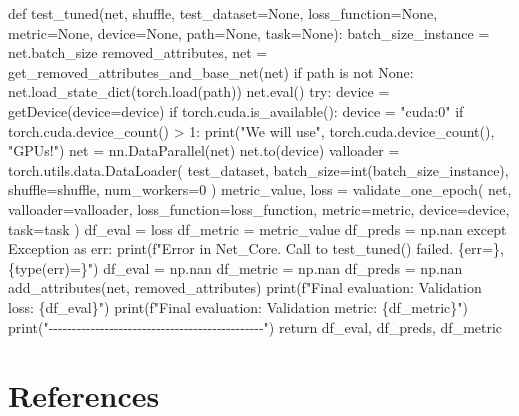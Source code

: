 \documentclass[
  letterpaper,
  DIV=11,
  numbers=noendperiod]{scrreprt}
\newenvironment{Shaded}{\begin{snugshade}}{\end{snugshade}}
\newcommand{\NormalTok}[1]{\textcolor[rgb]{0.00,0.23,0.31}{#1}}
\begin{document}
\begin{Shaded}
\begin{Highlighting}[]
\NormalTok{def test\_tuned(net, shuffle, test\_dataset=None, loss\_function=None,}
\NormalTok{    metric=None, device=None, path=None, task=None):}
\NormalTok{    batch\_size\_instance = net.batch\_size}
\NormalTok{    removed\_attributes, net = get\_removed\_attributes\_and\_base\_net(net)}
\NormalTok{    if path is not None:}
\NormalTok{        net.load\_state\_dict(torch.load(path))}
\NormalTok{        net.eval()}
\NormalTok{    try:}
\NormalTok{        device = getDevice(device=device)}
\NormalTok{        if torch.cuda.is\_available():}
\NormalTok{            device = "cuda:0"}
\NormalTok{            if torch.cuda.device\_count() \textgreater{} 1:}
\NormalTok{                print("We will use", torch.cuda.device\_count(), "GPUs!")}
\NormalTok{                net = nn.DataParallel(net)}
\NormalTok{        net.to(device)}
\NormalTok{        valloader = torch.utils.data.DataLoader(}
\NormalTok{            test\_dataset, batch\_size=int(batch\_size\_instance),}
\NormalTok{            shuffle=shuffle, }
\NormalTok{            num\_workers=0}
\NormalTok{        )}
\NormalTok{        metric\_value, loss = validate\_one\_epoch(}
\NormalTok{            net, valloader=valloader, loss\_function=loss\_function,}
\NormalTok{            metric=metric, device=device, task=task}
\NormalTok{        )}
\NormalTok{        df\_eval = loss}
\NormalTok{        df\_metric = metric\_value}
\NormalTok{        df\_preds = np.nan}
\NormalTok{    except Exception as err:}
\NormalTok{        print(f"Error in Net\_Core. Call to test\_tuned() failed. \{err=\}, }
\NormalTok{            \{type(err)=\}")}
\NormalTok{        df\_eval = np.nan}
\NormalTok{        df\_metric = np.nan}
\NormalTok{        df\_preds = np.nan}
\NormalTok{    add\_attributes(net, removed\_attributes)}
\NormalTok{    print(f"Final evaluation: Validation loss: \{df\_eval\}")}
\NormalTok{    print(f"Final evaluation: Validation metric: \{df\_metric\}")}
\NormalTok{    print("{-}{-}{-}{-}{-}{-}{-}{-}{-}{-}{-}{-}{-}{-}{-}{-}{-}{-}{-}{-}{-}{-}{-}{-}{-}{-}{-}{-}{-}{-}{-}{-}{-}{-}{-}{-}{-}{-}{-}{-}{-}{-}{-}{-}{-}{-}")}
\NormalTok{    return df\_eval, df\_preds, df\_metric}
\end{Highlighting}
\end{Shaded}

\hypertarget{references}{%
\chapter*{References}\label{references}}
\end{document}
